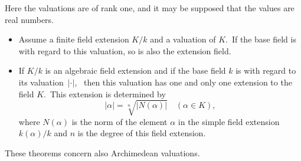 \documentclass[12pt]{article}
\begin{document}
Here the valuations are of rank one, and it may be supposed that the values are real numbers. 

\begin{itemize}
 \item Assume a finite field extension $K/k$ and a valuation of $K$. \,If the base field is  with regard to this valuation, so is also the extension field.
 \item If $K/k$ is an algebraic field extension and if the base field $k$ is  with regard to its valuation \,$|\cdot|$, \, then this valuation has one and only one extension to the field $K$. \,This extension is determined by
  $$|\alpha| = \sqrt[n]{|N(\alpha)|}\quad (\alpha \in K),$$
where $N(\alpha)$ is the norm of the element $\alpha$ in the simple field extension $k(\alpha)/k$ and $n$ is the degree of this field extension.
\end{itemize}

These theorems concern also Archimedean valuations.
\end{document}

